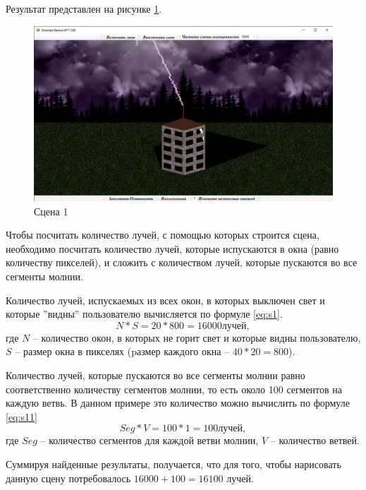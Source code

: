 Результат представлен на рисунке \ref{img:s1}.
\begin{figure}[H]
	\begin{center}
		\includegraphics[scale=0.40]{img/prog_res/s1.png}
	\end{center}
	\captionsetup{justification=centering}
	\caption{Сцена 1}
	\label{img:s1}
\end{figure}

Чтобы посчитать количество лучей, с помощью которых строится сцена, необходимо посчитать количество лучей, которые испускаются в окна (равно количеству пикселей), и сложить с количеством лучей, которые пускаются во все сегменты молнии.

Количество лучей, испускаемых из всех окон, в которых выключен свет и которые ''видны'' пользователю вычисляется по формуле \ref{eq:s1}.
\begin{equation}
	\label{eq:s1}
	N * S =  20 * 800 = 16 000 лучей,
\end{equation}
где $N$ -- количество окон, в которых не горит свет и которые видны пользователю, $S$ -- размер окна в пикселях (pазмер каждого окна -- $40 * 20 = 800$).

Количество лучей, которые пускаются во все сегменты молнии равно соответственно количеству сегментов молнии, то есть около 100 сегментов на каждую ветвь. В данном примере это количество можно вычислить по формуле \ref{eq:s11}
\begin{equation}
	\label{eq:s11}
	Seg * V = 100 * 1 = 100 лучей,
\end{equation}
где $Seg$ -- количество сегментов для каждой ветви молнии, $V$ -- количество ветвей.

Суммируя найденные результаты, получается, что для того, чтобы нарисовать данную сцену потребовалось $16 000 + 100 = 16 100$ лучей.

